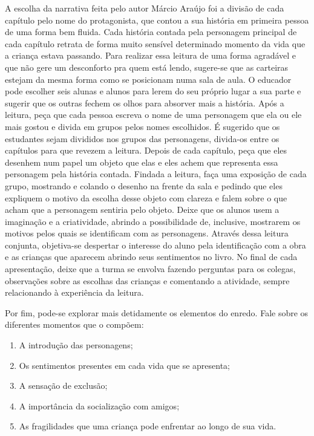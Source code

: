 \documentclass[11pt]{extarticle}
\begin{document}
A escolha da narrativa feita pelo autor Márcio Araújo foi a divisão de cada capítulo pelo nome do protagonista, que contou a sua história em primeira pessoa de uma forma bem fluida. Cada história contada pela personagem principal de cada capítulo retrata de forma muito sensível determinado momento da vida que a criança estava passando. Para realizar essa leitura de uma forma agradável e que não gere um desconforto pra quem está lendo, sugere-se que as carteiras estejam da mesma forma como se posicionam numa sala de aula. O educador pode escolher seis alunas e alunos para lerem do seu próprio lugar a sua parte e sugerir que os outras fechem os olhos para absorver mais a história. Após a leitura, peça que cada pessoa escreva o nome de uma personagem que ela ou ele mais gostou e divida em grupos pelos nomes escolhidos. É sugerido que os estudantes sejam divididos nos grupos das personagens, divida-os entre os capítulos para que revezem a leitura. Depois de cada capítulo, peça que eles desenhem num papel um objeto que elas e eles achem que representa essa personagem pela história contada. Findada a leitura, faça uma exposição de cada grupo, mostrando e colando o desenho na frente da sala e pedindo que eles expliquem o motivo da escolha desse objeto com clareza e falem sobre o que acham que a personagem sentiria pelo objeto. Deixe que os alunos usem a imaginação e a criatividade, abrindo a possibilidade de, inclusive, mostrarem os motivos pelos quais se identificam com as personagens. Através dessa leitura conjunta, objetiva-se despertar o interesse do aluno pela identificação com a obra e as crianças que aparecem abrindo seus sentimentos no livro. No final de cada apresentação, deixe que a turma se envolva fazendo perguntas para os colegas, observações sobre as escolhas das crianças e comentando a atividade, sempre relacionando à experiência da leitura. 


Por fim, pode-se explorar mais detidamente os elementos do enredo. Fale sobre os diferentes momentos que o compõem:

\begin{enumerate}


\item A introdução das personagens;
\item Os sentimentos presentes em cada vida que se apresenta;
\item A sensação de exclusão;
\item A importância da socialização com amigos;
\item As fragilidades que uma criança pode enfrentar ao longo de sua vida. 


\end{enumerate}
\end{document}
